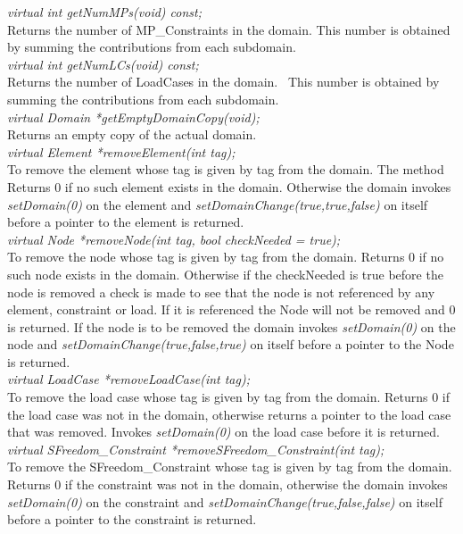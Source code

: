 {\em virtual int getNumMPs(void) const;}\\
Returns the number of MP\_Constraints in the domain. 
This number is obtained by summing the contributions from each subdomain. \\

{\em virtual int getNumLCs(void) const;}\\    
Returns the number of LoadCases in the domain. \
This number is obtained by summing the contributions from each subdomain. \\

{\em virtual Domain *getEmptyDomainCopy(void);}\\
Returns an empty copy of the actual domain.\\

{\em virtual Element *removeElement(int tag);}\\
To remove the element whose tag is given by \p tag from the
domain. The method Returns $0$ if no such element exists in the domain. Otherwise 
the domain invokes {\em setDomain(0)} on the element and {\em
setDomainChange(true,true,false)} on itself before a pointer to the
element is returned. \\

{\em virtual Node *removeNode(int tag, bool checkNeeded = true);}\\    
To remove the node whose tag is given by \p tag from the domain. 
Returns $0$ if no such node exists in the domain. Otherwise
if the \p checkNeeded is \p true before the node is removed a
check is made to see that the node is not referenced by any element,
constraint or load. If it is referenced the Node will not be
removed and $0$ is returned. If the node is to be removed the domain
invokes {\em setDomain(0)} on the node and {\em
setDomainChange(true,false,true)} on itself before a pointer to the
Node is returned.\\

{\em virtual LoadCase *removeLoadCase(int tag);}\\        
To remove the load case whose tag is given by \p tag from the domain. 
Returns $0$ if the load case was not in the domain, otherwise
returns a pointer to the load case that was removed. Invokes {\em
setDomain(0)} on the load case before it is returned.\\

{\em virtual SFreedom\_Constraint *removeSFreedom\_Constraint(int tag);}\\
To remove the SFreedom\_Constraint whose tag is given by \p tag from the
domain. Returns $0$ if the constraint was not in the domain, otherwise
the domain invokes {\em setDomain(0)} on the constraint and {\em
setDomainChange(true,false,false)} on itself before a pointer to the
constraint is returned.\\  

